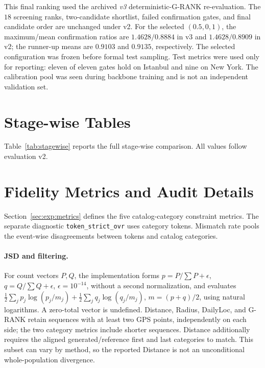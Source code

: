 This final ranking used the archived \emph{v3} deterministic-G-RANK
re-evaluation. The $18$ screening ranks, two-candidate shortlist, failed
confirmation gates, and final candidate order are unchanged under v2.
For the selected $(0.5,0,1)$, the maximum/mean confirmation ratios are
$1.4628/0.8884$ in v3 and $1.4628/0.8909$ in v2; the runner-up means are
$0.9103$ and $0.9135$, respectively. The selected configuration was frozen
before formal test sampling. Test metrics were used only for reporting:
eleven of eleven gates hold on Istanbul and nine on New York.
The calibration pool was seen during backbone training and is not an
independent validation set.

\section{Stage-wise Tables}
\label{app:ablation}
Table~\ref{tab:stagewise} reports the full stage-wise comparison. All values
follow evaluation v2.


\section{Fidelity Metrics and Audit Details}
\label{app:metrics}
Section~\ref{sec:exp:metrics} defines the five catalog-category constraint metrics.
The separate diagnostic \texttt{token\_strict\_ovr} uses category tokens.
Mismatch rate pools the event-wise disagreements between tokens and catalog
categories.

\paragraph{JSD and filtering.}
For count vectors $P,Q$, the implementation forms
$p=P/\sum P+\epsilon$, $q=Q/\sum Q+\epsilon$, $\epsilon=10^{-14}$, without a
second normalization, and evaluates
$\frac12\sum_jp_j\log(p_j/m_j)+\frac12\sum_jq_j\log(q_j/m_j)$,
$m=(p+q)/2$, using natural logarithms. A zero-total vector is undefined.
Distance, Radius, DailyLoc, and G-RANK retain sequences with at least two GPS
points, independently on each side; the two category metrics include shorter
sequences. Distance additionally requires the aligned generated/reference
first and last categories to match. This subset can vary by method, so the
reported Distance is not an unconditional whole-population divergence.

